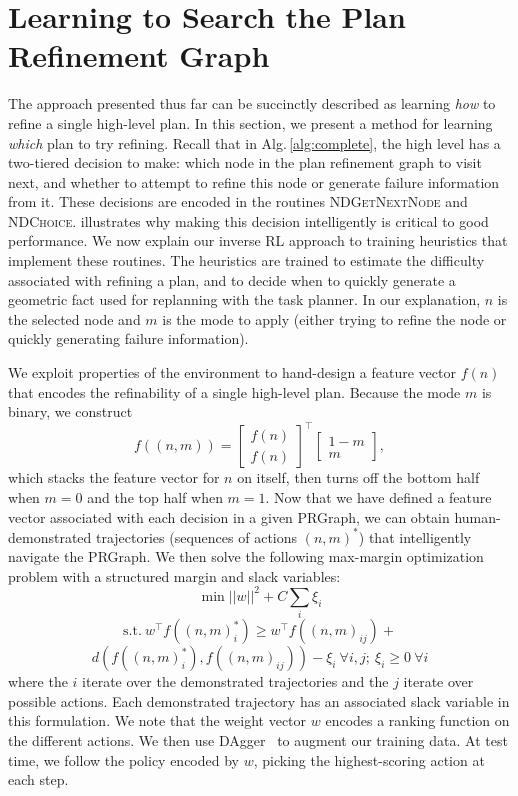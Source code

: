 \section{Learning to Search the Plan Refinement Graph}
The approach presented thus far can be succinctly described as learning \emph{how} to
refine a single high-level plan. In this section, we present a method for learning
\emph{which} plan to try refining. Recall that in Alg.\,\ref{alg:complete}, the high
level has a two-tiered decision to make: which node in the plan refinement graph to
visit next, and whether to attempt to refine this node or generate failure information
from it. These decisions are encoded in the routines \textsc{NDGetNextNode}
and \textsc{NDChoice}.  illustrates why making this decision intelligently is critical
to good performance. We now explain our inverse RL
approach to training heuristics that implement these routines. The heuristics are trained to estimate
the difficulty associated with refining a plan, and to decide when to quickly generate
a geometric fact used for replanning with the task planner. In our explanation, $n$ is the selected
node and $m$ is the mode to apply (either trying to refine the node or quickly generating failure information).

We exploit properties of the environment to hand-design a feature vector $f(n)$ that encodes the refinability
of a single high-level plan. Because the mode $m$ is binary,
we construct $$f((n, m)) = \begin{bmatrix} f(n) \\ f(n) \end{bmatrix}^\top \begin{bmatrix} 1 - m \\ m \end{bmatrix},$$
which stacks the feature vector for $n$ on itself, then turns off the bottom half when $m = 0$ and the
top half when $m = 1$. Now that we have defined a feature vector associated with each decision in a given PRGraph,
we can obtain human-demonstrated trajectories (sequences of actions $(n, m)^{*}$) that intelligently
navigate the PRGraph. We then solve the following max-margin optimization problem with a structured margin and slack variables:
$$\min ||w||^{2} + C\sum_{i} \xi_{i}$$
$$\text{s.t.}\ w^{\top}f((n, m)_{i}^{*}) \geq w^{\top}f((n, m)_{ij}) + $$
$$d(f((n, m)_{i}^{*}), f((n, m)_{ij})) - \xi_{i}\ \forall i, j;\ \xi_{i} \geq 0\ \forall i$$
where the $i$ iterate over the demonstrated trajectories and the $j$ iterate over possible actions. Each
demonstrated trajectory has an associated slack variable in this formulation.
We note that the weight vector $w$ encodes a ranking function on the different actions.
We then use DAgger~\cite{dagger} to augment our training data. At test time, we follow the policy encoded by
$w$, picking the highest-scoring action at each step.

